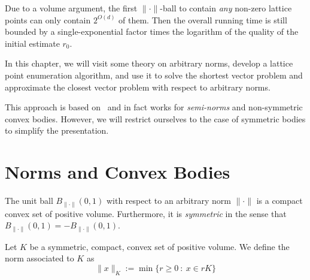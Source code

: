 Due to a volume argument,
the first $\|\cdot\|$-ball to contain \emph{any} non-zero lattice points
can only contain $2^{O(d)}$ of them.
Then the overall running time is still bounded by a single-exponential factor
times the logarithm of the quality of the initial estimate $r_0$.

In this chapter,
we will visit some theory on arbitrary norms,
develop a lattice point enumeration algorithm,
and use it to solve the shortest vector problem
and approximate the closest vector problem
with respect to arbitrary norms.

This approach is based on~\cite{DPV10}
and in fact works for \emph{semi-norms} and non-symmetric convex bodies.
However, we will restrict ourselves to the case of symmetric bodies
to simplify the presentation.


\section{Norms and Convex Bodies}

The unit ball
$B_{\|\cdot\|}(0,1)$
with respect to an arbitrary norm $\|\cdot\|$
is a compact convex set of positive volume.
Furthermore, it is \emph{symmetric}
in the sense that $B_{\|\cdot\|}(0,1) = -B_{\|\cdot\|}(0,1)$.

\begin{definition}
  Let $K$ be a symmetric, compact, convex set of positive volume.
  We define the norm associated to $K$ as
  \[
    \| x \|_K := \min\{ r \geq 0 ~:~ x \in r K \}
  \]
\end{definition}


